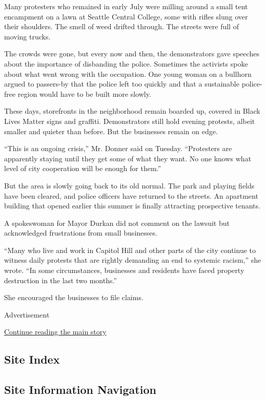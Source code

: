 Many protesters who remained in early July were milling around a small
tent encampment on a lawn at Seattle Central College, some with rifles
slung over their shoulders. The smell of weed drifted through. The
streets were full of moving trucks.

The crowds were gone, but every now and then, the demonstrators gave
speeches about the importance of disbanding the police. Sometimes the
activists spoke about what went wrong with the occupation. One young
woman on a bullhorn argued to passers-by that the police left too
quickly and that a sustainable police-free region would have to be built
more slowly.

These days, storefronts in the neighborhood remain boarded up, covered
in Black Lives Matter signs and graffiti. Demonstrators still hold
evening protests, albeit smaller and quieter than before. But the
businesses remain on edge.

``This is an ongoing crisis,'' Mr. Donner said on Tuesday. ``Protesters
are apparently staying until they get some of what they want. No one
knows what level of city cooperation will be enough for them.''

But the area is slowly going back to its old normal. The park and
playing fields have been cleared, and police officers have returned to
the streets. An apartment building that opened earlier this summer is
finally attracting prospective tenants.

A spokeswoman for Mayor Durkan did not comment on the lawsuit but
acknowledged frustrations from small businesses.

``Many who live and work in Capitol Hill and other parts of the city
continue to witness daily protests that are rightly demanding an end to
systemic racism,'' she wrote. ``In some circumstances, businesses and
residents have faced property destruction in the last two months.''

She encouraged the businesses to file claims.

Advertisement

\protect\hyperlink{after-bottom}{Continue reading the main story}

\hypertarget{site-index}{%
\subsection{Site Index}\label{site-index}}

\hypertarget{site-information-navigation}{%
\subsection{Site Information
Navigation}\label{site-information-navigation}}

